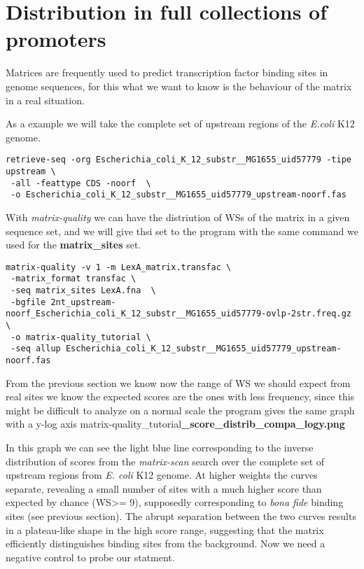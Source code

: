 \section{Distribution in full collections of promoters}

Matrices are frequently used to predict transcription factor binding
sites in genome sequences, for this what we want to know is the
behaviour of the matrix in a real situation.

As a example we will take the complete set of upstream regions of the
\textit{E.coli} K12 genome.

{\color{Blue} \begin{footnotesize}
\begin{verbatim}
retrieve-seq -org Escherichia_coli_K_12_substr__MG1655_uid57779 -tipe upstream \
 -all -feattype CDS -noorf  \
 -o Escherichia_coli_K_12_substr__MG1655_uid57779_upstream-noorf.fas
\end{verbatim} 
\end{footnotesize} 
}

With \textit{matrix-quality} we can have the distriution of WSs of the
matrix in a given sequence set, and we will give thsi set to the
program with the same command we used for the \textbf{matrix\_sites}
set.

{\color{Blue} 
\begin{footnotesize}
\begin{verbatim}
matrix-quality -v 1 -m LexA_matrix.transfac \
 -matrix_format transfac \
 -seq matrix_sites LexA.fna  \
 -bgfile 2nt_upstream-noorf_Escherichia_coli_K_12_substr__MG1655_uid57779-ovlp-2str.freq.gz \
 -o matrix-quality_tutorial \
 -seq allup Escherichia_coli_K_12_substr__MG1655_uid57779_upstream-noorf.fas
\end{verbatim} 
\end{footnotesize} 
}

From the previous section we know now the range of WS we should expect
from real sites we know the expected scores are the ones with less
frequency, since this might be difficult to analyze on a normal scale
the program gives the same graph with a y-log axis
matrix-quality\_tutorial\textbf{\_score\_distrib\_compa\_logy.png}

In this graph we can see the light blue line corresponding to the
inverse distribution of scores from the \textit{matrix-scan} search
over the complete set of upstream regions from \textit{E. coli} K12
genome. At higher weights the curves separate, revealing a small
number of sites with a much higher score than expected by chance (WS>=
9), supposedly corresponding to \textit{bona fide} binding sites (see
previous section). The abrupt separation between the two curves
results in a plateau-like shape in the high score range, suggesting
that the matrix efficiently distinguishes binding sites from the
background. Now we need a negative control to probe our statment.

